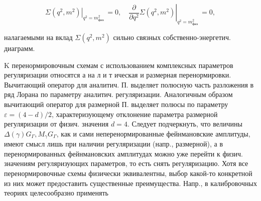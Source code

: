 \documentclass[10pt]{article}
\begin{document}
\[

\left.\Sigma\left(q^{2}, m^{2}\right)\right|_{q^{2}=m_{\text {физ }}^{2}}=0,\left.\quad \frac{\partial}{\partial q^{2}} \Sigma\left(q^{2}, m^{2}\right)\right|_{q^{2}=m_{\text {физ }}^{2}}=0,

\]



налагаемыми на вклад $\Sigma\left(q^{2}, m^{2}\right)$ сильно связных собственно-энергетич. диаграмм.



K перенормировочным схемам с использованием комплексных параметров регуляризации относятся а на л и т ическая и размерная перенормировки. Вычитающий оператор для аналитич. П. выделяет полюсную часть разложения в ряд Лорана по параметру аналитич. регуляризации. Аналогичным образом вычитающий оператор для размерной П. выделяет полюсы по параметру $\varepsilon=(4-d) / 2$, характеризующему отклонение параметра размерной регуляризации от физич. значения $d=4$. Следует подчеркнуть, что величины $\Delta(\gamma) G_{\Gamma}, M_{\gamma} G_{\Gamma}$, как и сами неперенормированные фейнмановские амплитуды, имеют смысл лишь при наличии регуляризации (напр., размерной), а в перенормированных фейнмановских амплитудах можно уже перейти к физич. значениям регуляризующих параметров, то есть снять регуляризацию. Хотя все перенормировочные схемы физически эквивалентны, выбор какой-то конкретной из них может предоставить существенные преимущества. Напр., в калибровочных теориях целесообразно применять
\end{document}
